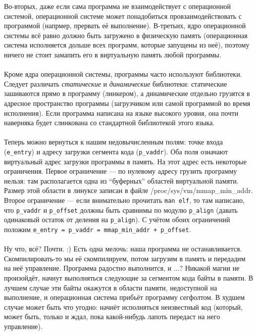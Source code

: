 \documentclass[11pt]{book}
\begin{document}
Во-вторых, даже если сама программа не взаимодействует с операционной системой,
операционной системе может понадобиться провзаимодействовать с программой (напрмер, прервать её выполнение).
В-третьих, ядро операционной системы всё равно должно быть загружено в физическую память
(операционная система исполняется дольше всех программ, которые запущены из неё),
поэтому ничего не стоит замапить его в виртуальную память любой программы.
\\ \\
Кроме ядра операционной системы, программы часто используют библиотеки.
Следует различать \emph{статические} и \emph{динамические} библиотеки:
статические зашиваются прямо в программу (линкером),
а динамические отдельно грузятся в адресное пространство программы
(загрузчиком или самой программой во время исполнения).
Если программа написана на языке высокого уровня,
она почти наверняка будет слинкована со стандартной библиотекой этого языка.
\\ \\
Теперь можно вернуться к нашим недовычисленным полям: точке входа (\texttt{e\_entry}) и адресу загрузки сегмента кода (\texttt{p\_vaddr}).
Оба поля означают виртуальный адрес загрузки программы в память.
На этот адрес есть некоторые ограничения.
Первое ограничение --- по нулевому адресу грузить программу нельзя: там располагается одна из ``буферных'' областей виртуальной памяти.
Размер этой области в линуксе записан в файле /proc/sys/vm/mmap\_min\_addr.
Второе ограничение --- если внимательно прочитать \texttt{man elf}, то там написано, что \texttt{p\_vaddr} и \texttt{p\_offset}
должны быть сравнимы по модулю \texttt{p\_align} (давать одинаковый остаток от деления на \texttt{p\_align}).
С учётом обоих ограничений положим \texttt{e\_entry = p\_vaddr = mmap\_min\_addr + p\_offset}.
\\ \\
Ну что, всё? Почти. :)
Есть одна мелочь: наша программа не останавливается.
Скомпилировать-то мы её скомпилируем, потом загрузим в память и передадим на неё управление.
Программа радостно выполнится, и ...?
Никакой магии не произойдёт, начнут выполняться следующие за сегментом кода байты в памяти.
В лучшем случае эти байты окажутся в области памяти, недоступной на выполнение, и операционная система прибьёт программу сегфолтом.
В худшем случае может быть что угодно: начнёт исполняться неизвестный код
(который, может быть, только и ждал, пока какой-нибудь лапоть передаст на него управление).
\\ \\
\end{document}

